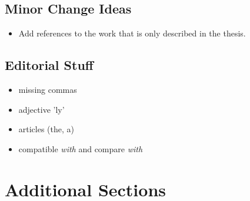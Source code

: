 \subsection{Minor Change Ideas}

\begin{itemize}
  \item Add references to the work that is only described in the
      thesis.
\end{itemize}

\subsection{Editorial Stuff}

\begin{itemize}
  \item missing commas
  \item adjective 'ly'
  \item articles (the, a)
  \item compatible \emph{with} and compare \emph{with}
\end{itemize}


\section{Additional Sections}

